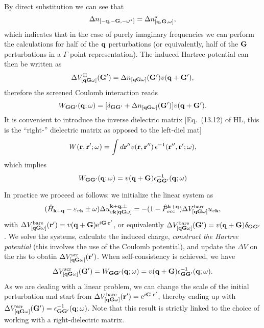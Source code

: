 \documentclass[twocolumn,prb,showpacs,superscriptaddress]{revtex4}
\def\w{\omega}
\def\H{\hat{H}}
\def\P{\hat{P}_{\rm occ}}
\def\E{\varepsilon}
\def\q{{\bf q}}
\def\k{{\bf k}}
\def\G{{\bf G}}
\def\Gp{{\bf G^\prime}}
\def\r{{\bf r}}
\def\rp{{\bf r^\prime}}
\def\rpp{{\bf r^{\prime\prime}}}
\begin{document}
By direct substitution we can see that
  \begin{equation}
  \Delta n_{[-\q,-\G,-\w^\star]} = \Delta n^\star_{[\q,\G,\w]},
  \end{equation}
which indicates that in the case of purely imaginary frequencies we can perform
the calculations for half of the $\q$ perturbations (or equivalently, half of the
$\G$ perturbations in a $\Gamma$-point representation).
The induced Hartree potential can then be written as 
  \begin{equation}
  \Delta V^{\rm H}_{[\q\G\w]}(\Gp) = \Delta n_{[\q\G\w]}(\Gp) v(\q+\Gp), 
  \end{equation}
therefore the screened Coulomb interaction reads
  \begin{equation}
  W_{\G\Gp}(\q;\w) = [\delta_{\G\Gp} + \Delta n_{[\q\G\w]}(\Gp) ]v(\q+\Gp).
  \end{equation}
It is convenient to introduce the inverse dielectric matrix [Eq.\ (13.12) of HL,
this is the ``right-'' dielectric matrix as opposed to the left-diel mat]
  \begin{equation}
  W(\r,\rp;\w) = \int d\rpp v(\r,\rpp) \, \epsilon^{-1}(\rpp,\rp;\w),
  \end{equation}
which implies
  \begin{equation}
  W_{\G\Gp}(\q;\w) = v(\q+\G)  \epsilon^{-1}_{\G\Gp}(\q;\w)  
  \end{equation}

In practice we proceed as follows: we initialize the linear system as
  \begin{equation}
  (\H_{\k+\q}-\E_{v\k}\pm\w) \Delta u^{\k+\q,\pm}_{v\k[\q\G\w]}  = -(1-\P^{\k+\q}) \Delta V^{\rm bare}_{[\q\G\w]} u_{v\k},
  \end{equation}
with $\Delta V^{\rm bare}_{[\q\G\w]}(\rp) = v(\q+\G) {\rm e}^{i\G\cdot\rp}$, or
equivalently $\Delta V^{\rm bare}_{[\q\G\w]}(\Gp) = v(\q+\G)\delta_{\G\Gp}$.
We solve the systems, calculate the induced charge, {\it construct the Hartree potential}
(this involves the use of the Coulomb potential), and update the $\Delta V$ on the rhs
to obatin $\Delta V^{\rm scr}_{[\q\G\w]}(\rp)$. When self-consistency is achieved, we have
  \begin{equation}
  \Delta V^{\rm scr}_{[\q\G\w]}(\Gp) = W_{\G\Gp}(\q;\w) = v(\q+\G) \epsilon^{-1}_{\G\Gp}(\q;\w).
  \end{equation}
As we are dealing with a linear problem, we can change the scale of the initial
perturbation and start from $\Delta V^{\rm bare}_{[\q\G\w]}(\rp) = {\rm e}^{i\G\cdot\rp}$,
thereby ending up with $\Delta V^{\rm scr}_{[\q\G\w]}(\Gp) = \epsilon^{-1}_{\G\Gp}(\q;\w)$.
Note that this result is strictly linked to the choice of working with a right-dielectric
matrix. 
\end{document}
